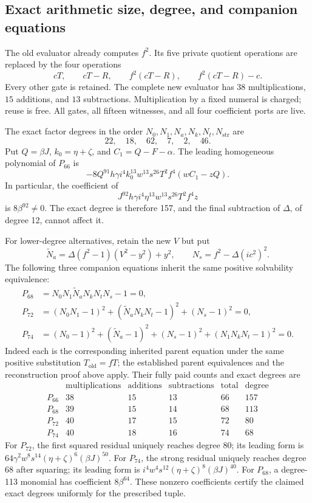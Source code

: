 \documentclass[11pt,letterpaper]{article}
\theoremstyle{remark}\newtheorem{remark}[theorem]{Remark}
\begin{document}
\subsection{Exact arithmetic size, degree, and companion equations}

The old evaluator already computes \(f^2\).  Its five private quotient
operations are replaced by the four operations
\[
 cT,\qquad cT-R,\qquad f^2(cT-R),\qquad f^2(cT-R)-c.
\]
Every other gate is retained.  The complete new evaluator has
\(38\) multiplications, \(15\) additions, and \(13\) subtractions.
Multiplication by a fixed numeral is charged; reuse is free.  All gates,
all fifteen witnesses, and all four coefficient ports are live.

The exact factor degrees in the order
\(N_0,N_1,N_a,N_k,N_t,N_{\mathrm{str}}\) are
\[
 22,\quad18,\quad62,\quad7,\quad2,\quad46.
\]
Put \(Q=\beta J\), \(k_0=\eta+\zeta\), and
\(C_1=Q-F-\alpha\).  The leading homogeneous polynomial of \(P_{66}\) is
\[
 -8Q^{91}h\gamma i^4k_0^{13}w^{13}s^{26}T^2f^4
       (wC_1-zQ).
\]
In particular, the coefficient of
\[
 J^{92}h\gamma i^4\eta^{13}w^{13}s^{26}T^2f^4z
\]
is \(8\beta^{92}\ne0\).  The exact degree is therefore 157, and the
final subtraction of \(\Delta\), of degree 12, cannot affect it.

For lower-degree alternatives, retain the new \(V\) but put
\[
 \widetilde N_a=\Delta(f^2-1)(V^2-y^2)+y^2,
 \qquad N_s=f^2-\Delta(ic^2)^2.
\]
The following three companion equations inherit the same positive
solvability equivalence:
\begin{align*}
 P_{68}&=N_0N_1\widetilde N_aN_kN_tN_s-1=0,\\
 P_{72}&=(N_0N_1-1)^2+(\widetilde N_aN_kN_t-1)^2+(N_s-1)^2=0,\\
 P_{74}&=(N_0-1)^2+(\widetilde N_a-1)^2+(N_s-1)^2
              +(N_1N_kN_t-1)^2=0.
\end{align*}
Indeed each is the corresponding inherited parent equation under the same
positive substitution \(T_{\mathrm{old}}=fT\); the established parent
equivalences and the reconstruction proof above apply.  Their fully paid
counts and exact degrees are
\[
\begin{array}{c|r|r|r|r|r}
 &\text{multiplications}&\text{additions}&\text{subtractions}
 &\text{total}&\text{degree}\\ \hline
 P_{66}&38&15&13&66&157\\
 P_{68}&39&15&14&68&113\\
 P_{72}&40&17&15&72&80\\
 P_{74}&40&18&16&74&68
\end{array}
\]
For \(P_{72}\), the first squared residual uniquely reaches degree 80;
its leading form is
\(64\gamma^2w^8s^{14}(\eta+\zeta)^6(\beta J)^{50}\).
For \(P_{74}\), the strong residual uniquely reaches degree 68 after
squaring; its leading form is
\(i^4w^4s^{12}(\eta+\zeta)^8(\beta J)^{40}\).
For \(P_{68}\), a degree-113 monomial has coefficient
\(8\beta^{64}\).  These nonzero coefficients certify the claimed exact
degrees uniformly for the prescribed tuple.
\end{document}
